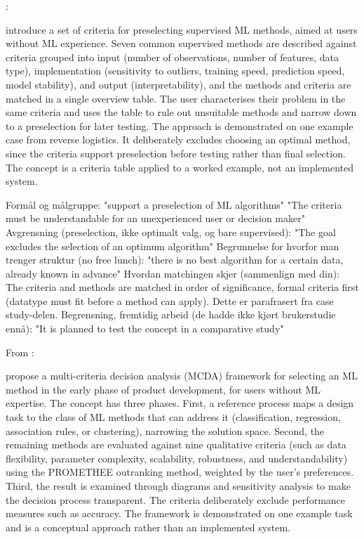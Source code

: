 \parencite{lickert2021_ml_selection_reverse_logistics}:

\textcite{lickert2021_ml_selection_reverse_logistics} introduce a set of criteria for 
preselecting supervised ML methods, aimed at users without ML 
experience. Seven common supervised methods are described 
against criteria grouped into input (number of observations, 
number of features, data type), implementation (sensitivity to 
outliers, training speed, prediction speed, model stability), 
and output (interpretability), and the methods and criteria 
are matched in a single overview table. The user characterises 
their problem in the same criteria and uses the table to rule 
out unsuitable methods and narrow down to a preselection for 
later testing. The approach is demonstrated on one example 
case from reverse logistics. It deliberately excludes choosing 
an optimal method, since the criteria support preselection 
before testing rather than final selection. The concept is a 
criteria table applied to a worked example, not an implemented 
system.

Formål og målgruppe:
"support a preselection of ML algorithms"
"The criteria must be understandable for an unexperienced user or decision maker"
Avgrensning (preselection, ikke optimalt valg, og bare supervised):
"The goal excludes the selection of an optimum algorithm"
Begrunnelse for hvorfor man trenger struktur (no free lunch):
"there is no best algorithm for a certain data, already known in advance"
Hvordan matchingen skjer (sammenlign med din):
The criteria and methods are matched in order of significance, formal criteria first (datatype must fit before a method can apply). Dette er parafrasert fra case study-delen.
Begrensning, fremtidig arbeid (de hadde ikke kjørt brukerstudie ennå):
"It is planned to test the concept in a comparative study"

From \parencite{sonntag2024_mcda_framework} :

\textcite{sonntag2024_mcda_framework} propose a multi-criteria decision 
analysis (MCDA) framework for selecting an ML method in the 
early phase of product development, for users without ML 
expertise. The concept has three phases. First, a reference 
process maps a design task to the class of ML methods that can 
address it (classification, regression, association rules, or 
clustering), narrowing the solution space. Second, the 
remaining methods are evaluated against nine qualitative 
criteria (such as data flexibility, parameter complexity, 
scalability, robustness, and understandability) using the 
PROMETHEE outranking method, weighted by the user's 
preferences. Third, the result is examined through diagrams 
and sensitivity analysis to make the decision process 
transparent. The criteria deliberately exclude performance 
measures such as accuracy. The framework is demonstrated on 
one example task and is a conceptual approach rather than an 
implemented system.

